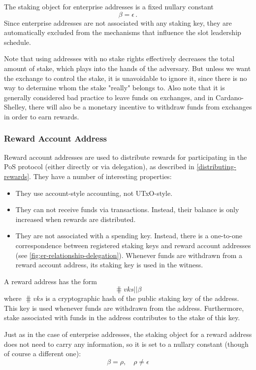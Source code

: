 \documentclass[11pt,a4paper,dvipsnames,twosided]{article}
\begin{document}
The staking object for enterprise addresses is a fixed nullary constant
\[
\beta = \epsilon\,.
\]
Since enterprise addresses are not associated with any staking key, they
are automatically excluded from the mechanisms that influence the slot
leadership schedule.

Note that using addresses with no stake rights effectively decreases
the total amount of stake, which plays into the hands of the adversary.
But unless we want the exchange to control the stake, it is unavoidable to
ignore it, since there is no way to determine whom the stake "really" belongs
to. Also note that it is generally considered bad practice to leave funds on
exchanges, and in Cardano-Shelley, there will also be a monetary incentive to
withdraw funds from exchanges in order to earn rewards.

\subsubsection{Reward Account Address}
\label{reward-address}

Reward account addresses are used to distribute rewards for participating in
the PoS protocol (either directly or via delegation), as described in
\ref{distributing-rewards}. They have a number of interesting
properties:

\begin{itemize}
\item They use account-style accounting, not UTxO-style.
\item They can not receive funds via transactions. Instead, their
  balance is only increased when rewards are distributed.
\item They are not associated with a spending key. Instead, there is a
  one-to-one correspondence between registered staking keys and reward
  account addresses (see \cref{fig:er-relationship-delegation}). Whenever funds
  are withdrawn from a reward account address, its staking key is used in the
  witness.
\end{itemize}

A reward address has the form
\[
\hash{vks} \mathbin{||} \beta
\]
where \(\hash{vks}\) is a cryptographic hash of the public staking key
of the address. This key is used whenever funds are withdrawn from the
address. Furthermore, stake associated with funds in the address
contributes to the stake of this key.

Just as in the case of enterprise addresses, the staking object for a reward
address does not need to carry any information, so it is set to a
nullary constant (though of course a different one):
\[
\beta = \rho, \quad \rho \neq \epsilon
\]
\end{document}
